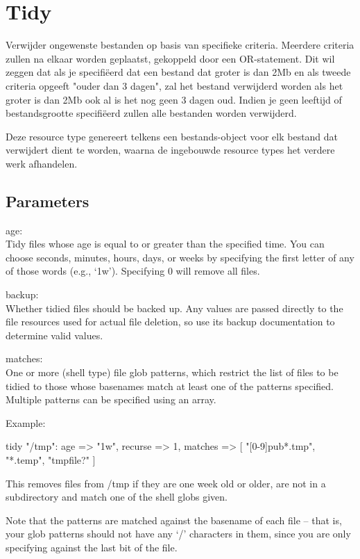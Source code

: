 \section{Tidy}

Verwijder ongewenste bestanden op basis van specifieke criteria. Meerdere criteria zullen na elkaar worden geplaatst, gekoppeld door een OR-statement. Dit wil zeggen dat als je specifi\"eerd dat een bestand dat groter is dan 2Mb en als tweede criteria opgeeft "ouder dan 3 dagen", zal het bestand verwijderd worden als het groter is dan 2Mb ook al is het nog geen 3 dagen oud. Indien je geen leeftijd of bestandsgrootte specifi\"eerd zullen alle bestanden worden verwijderd.

Deze resource type genereert telkens een bestands-object voor elk bestand dat verwijdert dient te worden, waarna de ingebouwde resource types het verdere werk afhandelen.

\subsection{Parameters}

age:\\
Tidy files whose age is equal to or greater than the specified time. You can choose seconds, minutes, hours, days, or weeks by specifying the first letter of any of those words (e.g., ‘1w’).
Specifying 0 will remove all files.

backup:\\
Whether tidied files should be backed up. Any values are passed directly to the file resources used for actual file deletion, so use its backup documentation to determine valid values.

matches:\\
One or more (shell type) file glob patterns, which restrict the list of files to be tidied to those whose basenames match at least one of the patterns specified. Multiple patterns can be specified using an array.

Example:

tidy { "/tmp":
  age => "1w",
  recurse => 1,
  matches => [ "[0-9]pub*.tmp", "*.temp", "tmpfile?" ]
}

This removes files from /tmp if they are one week old or older, are not in a subdirectory and match one of the shell globs given.

Note that the patterns are matched against the basename of each file – that is, your glob patterns should not have any ‘/’ characters in them, since you are only specifying against the last bit of the file.

